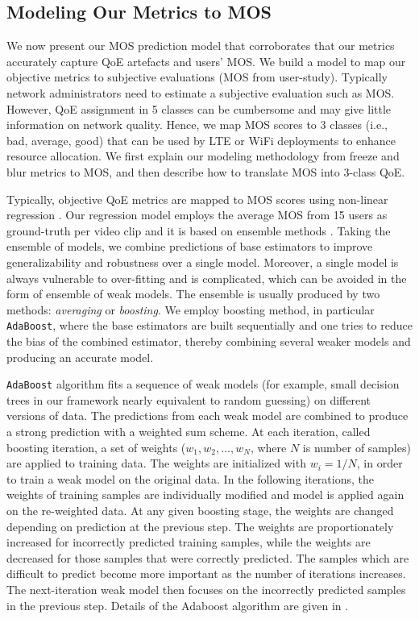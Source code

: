 \subsection{Modeling Our Metrics to MOS} \label{label:model}

We now present our MOS prediction model that corroborates that our metrics accurately capture QoE artefacts and users' MOS. We build a model to map our objective metrics to subjective evaluations (MOS from user-study). Typically network administrators need to estimate a subjective evaluation such as MOS. However, QoE assignment in 5 classes can be cumbersome and may give little information on network quality. Hence, we map MOS scores to 3 classes (i.e., bad, average, good) that can be used by LTE or WiFi deployments to enhance resource allocation. We first explain our modeling methodology from freeze and blur metrics to MOS, and then describe how to translate MOS into 3-class QoE.

Typically, objective QoE metrics are mapped to MOS scores using non-linear regression \cite{cui2008image}. 
Our regression model employs the average MOS from 15 users as ground-truth per video clip and it is based on ensemble methods \cite{ensemblemethods2008}. 
Taking the ensemble of models, we combine predictions of base estimators to improve generalizability and robustness over a single model.
Moreover, a single model is always vulnerable to over-fitting and is complicated, which can be avoided in the form of ensemble of weak models.
The ensemble is usually produced by two methods: \textit{averaging} or \textit{boosting}. 
We employ boosting method, in particular \texttt{AdaBoost}\cite{freund1997decision}, where the base estimators are built sequentially and one tries to reduce the bias of the combined estimator, thereby combining several weaker models and producing an accurate model. 

\texttt{AdaBoost} algorithm fits a sequence of weak models (for example, small decision trees in our framework nearly equivalent to random guessing) on different versions of data. 
The predictions from each weak model are combined to produce a strong prediction with a weighted sum scheme. 
At each iteration, called boosting iteration, a set of weights ($w_1, w_2, …, w_N$, where $N$ is number of samples) are applied to training data.
The weights are initialized with $w_i = 1/N$, in order to train a weak model on the original data.
In the following iterations, the weights of training samples are individually modified and model is applied again on the re-weighted data.
At any given boosting stage, the weights are changed depending on prediction at the previous step.
The weights are proportionately increased for incorrectly predicted training samples, while the weights are decreased for those samples that were correctly predicted.
The samples which are difficult to predict become more important as the number of iterations increases.
The next-iteration weak model then focuses on the incorrectly predicted samples in the previous step.
Details of the Adaboost algorithm are given in \cite{freund1997decision}\cite{drucker1997improving}.

